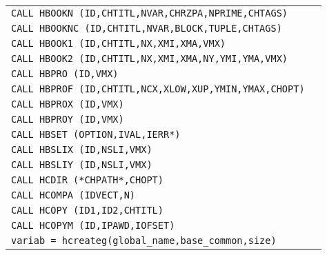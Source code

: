 \begin{longtable}{|>{\tt}p{.9\linewidth}r|}
CALL     HBOOKN (ID,CHTITL,NVAR,CHRZPA,NPRIME,CHTAGS)
&                                                       \pageref{HBOOKN} \\
CALL     HBOOKNC (ID,CHTITL,NVAR,BLOCK,TUPLE,CHTAGS)
&                                                       \pageref{HBOOKNC}\\
CALL     HBOOK1 (ID,CHTITL,NX,XMI,XMA,VMX)   
&                                                       \pageref{HBOOK1} \\
CALL     HBOOK2 (ID,CHTITL,NX,XMI,XMA,NY,YMI,YMA,VMX)
&                                                       \pageref{HBOOK2} \\
CALL     HBPRO  (ID,VMX)                     
&                                                       \pageref{HBPRO}  \\
CALL     HBPROF (ID,CHTITL,NCX,XLOW,XUP,YMIN,YMAX,CHOPT)
&                                                       \pageref{HBPROF} \\
CALL     HBPROX (ID,VMX)                     
&                                                       \pageref{HBPROX} \\
CALL     HBPROY (ID,VMX)                     
&                                                       \pageref{HBPROY} \\
CALL     HBSET  (OPTION,IVAL,IERR*)                
&                                                       \pageref{HBSET}  \\
CALL     HBSLIX (ID,NSLI,VMX)                
&                                                       \pageref{HBSLIX} \\
CALL     HBSLIY (ID,NSLI,VMX)                
&                                                       \pageref{HBSLIY} \\
CALL     HCDIR  (*CHPATH*,CHOPT)             
&                                                       \pageref{HCDIR}  \\
CALL     HCOMPA (IDVECT,N)                   
&                                                       \pageref{HCOMPA} \\
CALL     HCOPY  (ID1,ID2,CHTITL)             
&                                                       \pageref{HCOPY}  \\
CALL     HCOPYM (ID,IPAWD,IOFSET)            
&                                                       \pageref{HCOPYM} \\
variab = hcreateg(global\_name,base\_common,size)
&                                                     \pageref{hcreateg} \\

\end{longtable}

